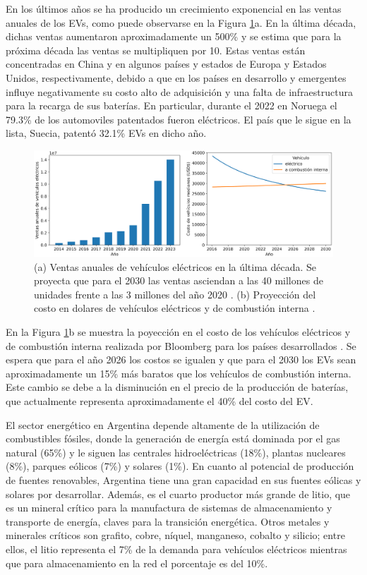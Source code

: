 En los últimos años se ha producido un crecimiento exponencial en las ventas 
anuales de los EVs, como puede observarse en la Figura \ref{fig:evs}a. En la
última década, dichas ventas aumentaron aproximadamente un 500\% y se estima que
para la próxima década las ventas se multipliquen por 10. Estas ventas están 
concentradas en China y en algunos países y estados de Europa y Estados Unidos, 
respectivamente, debido a que en los países en desarrollo y emergentes influye 
negativamente su costo alto de adquisición y una falta de infraestructura para la 
recarga de sus baterías. En particular, durante el 2022 en Noruega el 79.3\% de 
los automoviles patentados fueron eléctricos. El país que le sigue en la lista,
Suecia, patentó 32.1\% EVs en dicho año.
\begin{figure}[h!]
    \centering
    \includegraphics[width=\textwidth]{Introduccion/energia/evs.png}
    \caption{(a) Ventas anuales de vehículos eléctricos en la última década. Se 
    proyecta que para el 2030 las ventas asciendan a las 40 millones de unidades 
    frente a las 3 millones del año 2020 \cite{EVV}. (b) Proyección del costo en 
    dolares de vehículos eléctricos y de combustión interna \cite{BLOOMBERG}.}
    \label{fig:evs}
\end{figure}

En la Figura \ref{fig:evs}b se muestra la poyección en el costo de los vehículos 
eléctricos y de combustión interna realizada por Bloomberg para los países 
desarrollados \cite{BLOOMBERG}. Se espera que para el año 2026 los costos se 
igualen y que para el 2030 los EVs sean aproximadamente un 15\% más baratos que 
los vehículos de combustión interna. Este cambio se debe a la disminución en el
precio de la producción de baterías, que actualmente representa aproximadamente 
el 40\% del costo del EV.

El sector energético en Argentina depende altamente de la utilización de 
combustibles fósiles, donde la generación de energía está dominada por el gas 
natural (65\%) y le siguen las centrales hidroeléctricas (18\%), plantas nucleares
(8\%), parques eólicos (7\%) y solares (1\%). En cuanto al potencial de 
producción de fuentes renovables, Argentina tiene una gran capacidad en sus 
fuentes eólicas y solares por desarrollar. Además, es el cuarto productor más 
grande de litio, que es un mineral crítico para la manufactura de sistemas de 
almacenamiento y transporte de energía, claves para la transición energética. 
Otros metales y minerales críticos son grafito, cobre, níquel, manganeso, cobalto 
y silicio; entre ellos, el litio representa el 7\% de la demanda para vehículos 
eléctricos mientras que para almacenamiento en la red el porcentaje es del 10\%.

